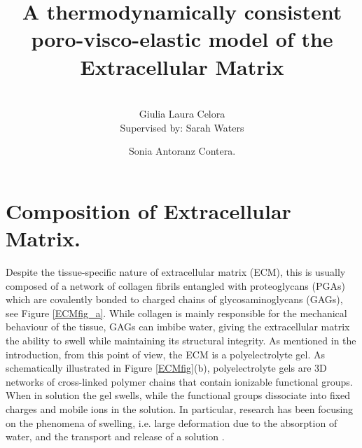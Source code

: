 \documentclass[runningheads]{llncs}
\begin{document}
%
\title{A thermodynamically consistent poro-visco-elastic model of the Extracellular Matrix}
%
%
\author{\\[0.2cm] Giulia Laura Celora \\[0.5cm]{\normalfont Supervised by:} Sarah Waters  \and Sonia Antoranz Contera. }
%
%
\maketitle              %
%
\begin{abstract}

\end{abstract}
%
%
%


\section{Composition of Extracellular Matrix.}
\label{ECMcomp}
Despite the tissue-specific nature of extracellular matrix (ECM), this is usually composed of a network of collagen fibrils entangled with proteoglycans (PGAs) which are covalently bonded to charged chains of glycosaminoglycans (GAGs), see Figure \ref{ECMfig_a}.  While collagen is mainly responsible for the mechanical behaviour of the tissue, GAGs can imbibe water, giving the extracellular matrix the ability to swell while maintaining its structural integrity. As mentioned in the introduction, from this point of view, the ECM is a polyelectrolyte gel. As schematically illustrated in Figure \ref{ECMfig}(b), polyelectrolyte gels are 3D networks of cross-linked polymer chains that contain ionizable functional groups. When in solution the gel swells, while the functional groups dissociate into fixed charges and mobile ions in the solution. In particular, research has been focusing on the phenomena of swelling, i.e. large deformation due to the absorption of water, and the transport and release of a solution  \cite{DROZDOV+,DROZDOVph,Reviewpolyel,swell2}.
\end{document}
